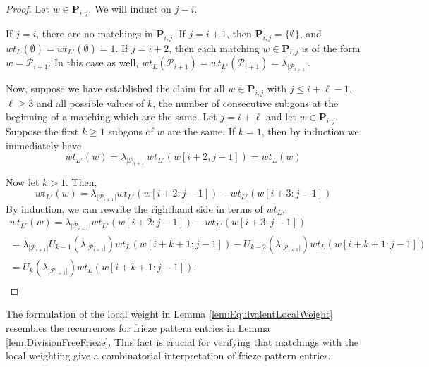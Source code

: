 \documentclass[12pt]{article}
\theoremstyle{remark}
\newcommand*{\pathset}[2]{\mathbf{P}_{#1,#2}}
\newcommand*{\poly}[1]{\mathcal{P}_{#1}}
\begin{document}
\begin{proof}
Let $w \in \pathset{i}{j}$. We will induct on $j - i$. 

If $j = i$, there are no matchings in $\pathset{i}{j}$. If $j = i+1$, then $\pathset{i}{j} = \{\emptyset\}$, and $wt_L(\emptyset) = wt_{L'}(\emptyset) = 1$. If $j = i+2$, then each matching $w \in \pathset{i}{j}$ is of the form $w = \poly{i+1}$. In this case as well, $wt_L(\poly{i+1}) = wt_{L'}(\poly{i+1}) = \lambda_{\vert \poly{i+1}\vert}$.

Now, suppose we have established the claim for all $w \in \pathset{i}{j}$ with $j \leq i + \ell - 1$, $\ell \geq 3$ and all possible values of $k$, the number of consecutive subgons at the beginning of a matching which are the same. Let $j = i + \ell$ and let $w \in \pathset{i}{j}$. Suppose the first $k \geq 1$ subgons of $w$ are the same. If $k = 1$, then by induction we immediately have \[
wt_{L'}(w) = \lambda_{\vert \poly{i+1}\vert} wt_{L'}(w[i+2,j-1]) = wt_L(w)
\]

Now let $k > 1$. Then,\[
wt_{L'}(w) = \lambda_{\vert \poly{i+1}\vert} wt_{L'}(w[i+2:j-1]) - wt_{L'}(w[i+3:j-1])
\]
By induction, we can rewrite the righthand side in terms of $wt_L$,\begin{align*}
wt_{L'}(w) = \lambda_{\vert \poly{i+1}\vert} wt_{L'}(w[i+2:j-1]) - wt_{L'}(w[i+3:j-1])\\
= \lambda_{\vert \poly{i+1}\vert} U_{k-1}(\lambda_{\vert \poly{i+1}\vert})wt_{L}(w[i+k+1:j-1]) - U_{k-2}(\lambda_{\vert \poly{i+1}\vert})wt_{L}(w[i+k+1:j-1])
\\= U_{k}(\lambda_{\vert \poly{i+1}\vert})wt_{L}(w[i+k+1:j-1]).\\
\end{align*}
\end{proof}

The formulation of the local weight in Lemma \ref{lem:EquivalentLocalWeight} resembles the recurrences for frieze pattern entries in Lemma \ref{lem:DivisionFreeFrieze}.
This fact is crucial for verifying that matchings with the local weighting give a combinatorial interpretation of frieze pattern entries.
\end{document}
